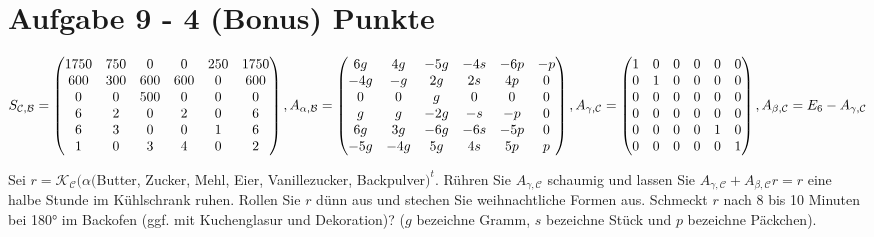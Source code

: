 \section*{Aufgabe 9 - 4 (Bonus) Punkte}
    $S_{\mathcal{C},\mathcal{B}} = \begin{pmatrix}
    1750 & 750 & 0&0&250&1750\\
    600&300&600&600&0&600\\
    0&0&500&0&0&0\\
    6&2&0&2&0&6\\
    6&3&0&0&1&6\\
    1&0&3&4&0&2
    \end{pmatrix}, A_{\alpha,\mathcal{B}} = \begin{pmatrix}
    6g&4g&-5g&-4s&-6p&-p\\
    -4g&-g&2g&2s&4p&0\\
    0&0&g&0&0&0\\
    g&g&-2g&-s&-p&0\\
    6g&3g&-6g&-6s&-5p&0\\
    -5g&-4g&5g&4s&5p&p
    \end{pmatrix},\\
     A_{\gamma,\mathcal{C}} = \begin{pmatrix}
    1&0&0&0&0&0\\
    0&1&0&0&0&0\\
    0&0&0&0&0&0\\
    0&0&0&0&0&0\\
    0&0&0&0&1&0\\
    0&0&0&0&0&1\\
    \end{pmatrix},
    A_{\beta,\mathcal{C}} = E_6 - A_{\gamma,\mathcal{C}} $

    Sei $r = \mathcal{K}_{\mathcal{C}}(\alpha($Butter, Zucker, Mehl, Eier, Vanillezucker, Backpulver$)^t$. Rühren Sie $A_{\gamma,\mathcal{C}}$ schaumig und lassen Sie $A_{\gamma,\mathcal{C}} + A_{\beta,\mathcal{C}} r = r$ eine halbe Stunde im Kühlschrank ruhen. Rollen
    Sie $r$ dünn aus und stechen Sie weihnachtliche Formen aus.
    Schmeckt $r$ nach 8 bis 10 Minuten bei 180° im Backofen (ggf. mit Kuchenglasur und Dekoration)?
    ($g$ bezeichne Gramm, $s$ bezeichne Stück und $p$ bezeichne Päckchen).


